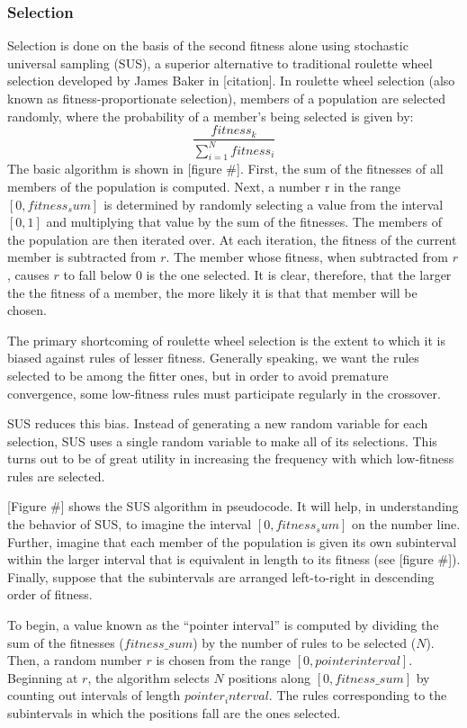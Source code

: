 \documentclass[11pt]{article}
\begin{document}
\subsubsection*{Selection}

Selection is done on the basis of the second fitness alone using stochastic universal sampling (SUS), a superior alternative to traditional roulette wheel selection developed by James Baker in [citation]. In roulette wheel selection (also known as fitness-proportionate selection), members of a population are selected randomly, where the probability of a member’s being selected is given by:
$$ \frac{fitness_k}{\sum_{i=1}^Nfitness_i}$$
The basic algorithm is shown in [figure \#]. First, the sum of the fitnesses of all members of the population is computed. Next, a number r in the range $[0, fitness_sum]$ is determined by randomly selecting a value from the interval $[0,1]$ and multiplying that value by the sum of the fitnesses. The members of the population are then iterated over. At each iteration, the fitness of the current member is subtracted from $r$. The member whose fitness, when subtracted from $r$, causes $r$ to fall below 0 is the one selected. It is clear, therefore, that the larger the the fitness of a member, the more likely it is that that member will be chosen.

The primary shortcoming of roulette wheel selection is the extent to which it is biased against rules of lesser fitness. Generally speaking, we want the rules selected to be among the fitter ones, but in order to avoid premature convergence, some low-fitness rules must participate regularly in the crossover.

SUS reduces this bias. Instead of generating a new random variable for each selection, SUS uses a single random variable to make all of its selections. This turns out to be of great utility in increasing the frequency with which low-fitness rules are selected.

[Figure \#] shows the SUS algorithm in pseudocode. It will help, in understanding the behavior of SUS, to imagine the interval $[0, fitness_sum]$ on the number line. Further, imagine that each member of the population is given its own subinterval within the larger interval that is equivalent in length to its fitness (see [figure \#]). Finally, suppose that the subintervals are arranged left-to-right in descending order of fitness. 

To begin, a value known as the ``pointer interval'' is computed by dividing the sum of the fitnesses ($fitness\_sum$) by the number of rules to be selected ($N$). Then, a random number $r$ is chosen from the range $[0, pointer interval]$. Beginning at $r$, the algorithm selects $N$ positions along $[0, fitness\_sum]$ by counting out intervals of length $pointer_interval$. The rules corresponding to the subintervals in which the positions fall are the ones selected.
\end{document}
